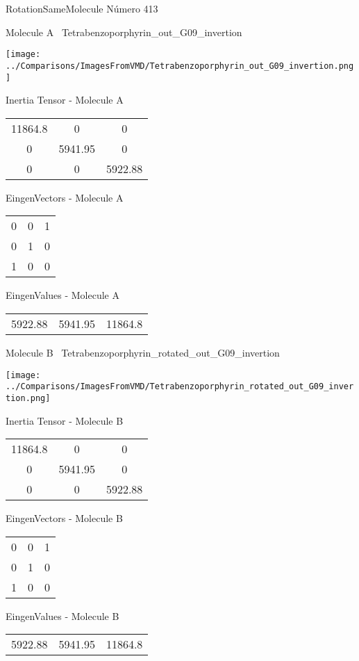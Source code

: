 \vtab[-3cm]
\begin{center}
{\large RotationSameMolecule \tab Número 413}
\end{center}
\begin{multicols}{2}
\begin{center}

Molecule A \
Tetrabenzoporphyrin\_out\_G09\_invertion

\texttt{[image: ../Comparisons/ImagesFromVMD/Tetrabenzoporphyrin\_out\_G09\_invertion.png]}

Inertia Tensor - Molecule A \\
\begin{tabular}{|c c c|}
11864.8	 & 	0	 & 	0	 \\
0	 & 	5941.95	 & 	0	 \\
0	 & 	0	 & 	5922.88
\end{tabular}

\vtab
 EingenVectors - Molecule A     \\
\begin{tabular}{|c c c|}
0	 & 	0	 & 	1	 \\
0	 & 	1	 & 	0	 \\
1	 & 	0	 & 	0
\end{tabular}

\vtab
 EingenValues - Molecule A     \\
\begin{tabular}{|c c c|}
5922.88	 & 	5941.95	 & 	11864.8	 \\
\end{tabular}
\columnbreak

Molecule B \
Tetrabenzoporphyrin\_rotated\_out\_G09\_invertion

\texttt{[image: ../Comparisons/ImagesFromVMD/Tetrabenzoporphyrin\_rotated\_out\_G09\_invertion.png]}

Inertia Tensor - Molecule B \\
\begin{tabular}{|c c c|}
11864.8	 & 	0	 & 	0	 \\
0	 & 	5941.95	 & 	0	 \\
0	 & 	0	 & 	5922.88
\end{tabular}

\vtab
 EingenVectors - Molecule B     \\
\begin{tabular}{|c c c|}
0	 & 	0	 & 	1	 \\
0	 & 	1	 & 	0	 \\
1	 & 	0	 & 	0
\end{tabular}

\vtab
 EingenValues - Molecule B     \\
\begin{tabular}{|c c c|}
5922.88	 & 	5941.95	 & 	11864.8	 \\
\end{tabular}

\end{center}
\end{multicols}

